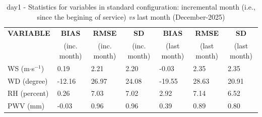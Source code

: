 \begin{table}[h!]
\begin{center}
\begin{tabular}{|l|l|l|l|l|l|l|}
\hline
\multicolumn{1}{|c|}{\cellcolor[HTML]{C0C0C0}\textbf{VARIABLE}} & \multicolumn{1}{c|}{\cellcolor[HTML]{C0C0C0}\textbf{BIAS}} & \multicolumn{1}{c|}{\cellcolor[HTML]{C0C0C0}\textbf{RMSE}} & \multicolumn{1}{c|}{\cellcolor[HTML]{C0C0C0}\textbf{SD}} & \multicolumn{1}{c|}{\cellcolor[HTML]{C0C0C0}\textbf{BIAS}} & \multicolumn{1}{c|}{\cellcolor[HTML]{C0C0C0}\textbf{RMSE}} & \multicolumn{1}{c|}{\cellcolor[HTML]{C0C0C0}\textbf{SD}}\\
\multicolumn{1}{|c|}{\cellcolor[HTML]{C0C0C0}} & \multicolumn{1}{c|}{\cellcolor[HTML]{C0C0C0}(inc. month)} & \multicolumn{1}{c|}{\cellcolor[HTML]{C0C0C0}(inc. month)} & \multicolumn{1}{c|}{\cellcolor[HTML]{C0C0C0}(inc. month)} & \multicolumn{1}{c|}{\cellcolor[HTML]{C0C0C0}(last month)} & \multicolumn{1}{c|}{\cellcolor[HTML]{C0C0C0}(last month)} & \multicolumn{1}{c|}{\cellcolor[HTML]{C0C0C0}(last month)}\\\hline
\cellcolor[HTML]{C0C0C0}WS (m$\cdot$s$^{-1}$) &      0.19  &      2.21  &      2.20  &     -0.03     &      2.35     &      2.35\\
\cellcolor[HTML]{C0C0C0}WD (degree)           &    -12.16  &     26.97  &     24.08  &    -19.55     &     28.63     &     20.91\\
\cellcolor[HTML]{C0C0C0}RH (percent)          &      0.26  &      7.03  &      7.02  &      2.92     &      7.14     &      6.52\\
\cellcolor[HTML]{C0C0C0}PWV (mm)              &     -0.03 &      0.96 &      0.96 &      0.39    &      0.89    &      0.80\\
\hline
\end{tabular}
\caption{day1 - Statistics for variables in standard configuration: incremental month (i.e., since the begining of service) \textit{vs} last month (December-2025)}\label{tab:day1:statBEF}
\end{center}
\end{table}

